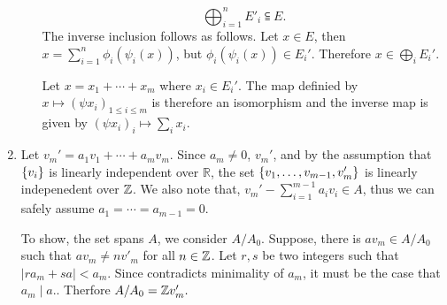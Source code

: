 \documentclass{article}
\theoremstyle{definition}
\theoremstyle{remark}
\begin{document}
\begin{enumerate}[(1)]
\begin{enumerate}[(a)]
        $$\bigoplus_{i=1}^n E'_i \subseteqq E.$$
        The inverse inclusion follows as follows. Let $x \in E$, then $x = \sum_{i=1}^n \phi_i(\psi_i(x))$, but $\phi_i(\psi_i(x)) \in E_i'$. Therefore $x \in \bigoplus_i E_i'.$

        Let $x = x_1 +\cdots + x_m$ where $x_i \in E_i'$. The map definied by $x \mapsto (\psi x_i)_{1 \leq i \leq m}$ is therefore an isomorphism and the inverse map is given by $(\psi x_i)_i \mapsto \sum_i x_i.$
    \end{enumerate}
\item  Let $v_m' = a_1v_1 + \cdots + a_{m}v_{m}$. Since $a_m \neq 0$, $v_m'$, and by the assumption that $\{v_i\}$ is linearly independent over $\mathbb{R}$, the set $\{v_1, \dots, v_{m-1}, v'_{m}\}$ is linearly indepenedent over $\mathbb{Z}$. We also note that, $v_m' -  \sum_{i = 1}^{m-1} a_iv_i \in A$, thus we can safely assume $a_1 = \cdots = a_{m-1}= 0.$

To show, the set spans $A$, we consider  $A/A_0.$  Suppose, there is $av_m \in A/A_0$ such that $av_m \neq  nv'_m$ for all $ n \in \mathbb{Z}$. Let $r, s$ be two integers such that $|ra_m + sa| < a_m$.  Since contradicts minimality of $a_m$, it must be the case that $a_m \mid a.$. Therfore $A/A_0 = \mathbb{Z} v'_m.$ 
\end{enumerate}
\end{document}
